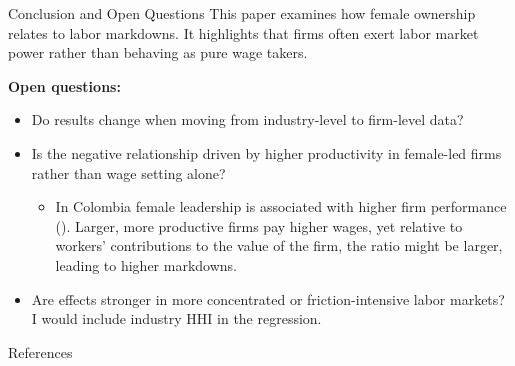 \documentclass[11pt,aspectratio=169]{beamer}
\begin{document}
\begin{frame}{Conclusion and Open Questions}
This paper examines how female ownership relates to labor markdowns. It highlights that firms often exert labor market power rather than behaving as pure wage takers.

\textbf{Open questions:}
\begin{itemize}
  \item Do results change when moving from industry-level to firm-level data?
  \item Is the negative relationship driven by higher productivity in female-led firms rather than wage setting alone?
  \begin{itemize}
    \item In Colombia female leadership is associated with higher firm performance (\cite{moreno-gomez_relationship_2018}). Larger, more productive firms pay higher wages, yet relative to workers' contributions to the value of the firm, the ratio might be larger, leading to higher markdowns.
  \end{itemize}
  \item Are effects stronger in more concentrated or friction-intensive labor markets? I would include industry HHI in the regression.
\end{itemize}
\end{frame}

\begin{frame}[allowframebreaks]{References}
\footnotesize


\end{frame}
\end{document}
